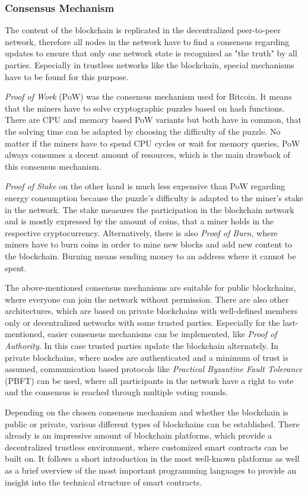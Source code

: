 \documentclass[conference]{IEEEtran}
\begin{document}
\subsubsection{Consensus Mechanism}
The content of the blockchain is replicated in the decentralized peer-to-peer network, therefore all nodes in the network have to find a consensus regarding updates to ensure that only one network state is recognized as "the truth" by all parties. Especially in trustless networks like the blockchain, special mechanisms have to be found for this purpose. \cite{Dinh?}\par 
\textit{Proof of Work} (PoW) was the consensus mechanism used for Bitcoin. It means that the miners have to solve cryptographic puzzles based on hash functions. There are CPU and memory based PoW variants but both have in common, that the solving time can be adapted by choosing the difficulty of the puzzle. No matter if the miners have to spend CPU cycles or wait for memory queries, PoW always consumes a decent amount of resources, which is the main drawback of this consensus mechanism. \cite{Dinh?} \cite{Golze2009} \par
\textit{Proof of Stake} on the other hand is much less expensive than PoW regarding energy consumption because the puzzle's difficulty is adapted to the miner's stake in the network. The stake measures the participation in the blockchain network and is mostly expressed by the amount of coins, that a miner holds in the respective cryptocurrency. Alternatively, there is also \textit{Proof of Burn}, where miners have to burn coins in order to mine new blocks and add new content to the blockchain. Burning means sending money to an address where it cannot be spent. \cite{Dinh?} \par
The above-mentioned consensus mechanisms are suitable for public blockchains, where everyone can join the network without permission. There are also other architectures, which are based on private blockchains with well-defined members only or decentralized networks with some trusted parties. Especially for the last-mentioned, easier consensus mechanisms can be implemented, like \textit{Proof of Authority}. In this case trusted parties update the blockchain alternately. In private blockchains, where nodes are authenticated and a minimum of trust is assumed, communication based protocols like \textit{Practical Byzantine Fault Tolerance} (PBFT) can be used, where all participants in the network have a right to vote and the consensus is reached through multiple voting rounds. \cite{Dinh?} \par 
Depending on the chosen consensus mechanism and whether the blockchain is public or private, various different types of blockchains can be established. There already is an impressive amount of blockchain platforms, which provide a decentralized trustless environment, where customized smart contracts can be built on. It follows a short introduction in the most well-known platforms as well as a brief overview of the most important programming languages to provide an insight into the technical structure of smart contracts. 
\end{document}
